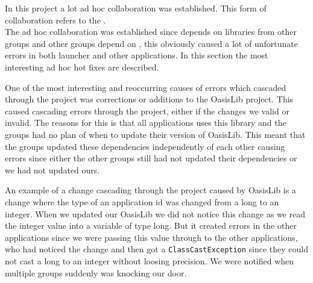 In this project a lot ad hoc collaboration was established.
This form of collaboration refers to the \Cref{}.\\ %

The ad hoc collaboration was established since \launcher depends on libraries from other groups and other groups depend on \launcher, this obviously caused a lot of unfortunate errors in both launcher and other applications.
In this section the most interesting ad hoc hot fixes are described.

One of the most interesting and reoccurring causes of errors which cascaded through the \giraf project was corrections or additions to the OasisLib project.
This caused cascading errors through the project, either if the changes we valid or invalid.
The reasons for this is that all applications uses this library and the groups had no plan of when to update their version of OasisLib.
This meant that the groups updated these dependencies independently of each other causing errors since either the other groups still had not updated their dependencies or we had not updated ours.

An example of a change cascading through the project caused by OasisLib is a change where the type of an application id was changed from a long to an integer.
When we updated our OasisLib we did not notice this change as we read the integer value into a variable of type long.
But it created errors in the other applications since we were passing this value through to the other applications, who had noticed the change and then got a \lstinline!ClassCastException! since they could not cast a long to an integer without loosing precision.
We were notified when multiple groups suddenly was knocking our door.





